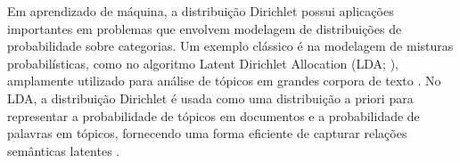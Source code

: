 Em aprendizado de máquina, a distribuição Dirichlet possui aplicações importantes em problemas que envolvem modelagem de distribuições de probabilidade sobre categorias. Um exemplo clássico é na modelagem de misturas probabilísticas, como no algoritmo Latent Dirichlet Allocation (LDA; \citealp{lda}), amplamente utilizado para análise de tópicos em grandes corpora de texto \cite{jelodar2019}. No LDA, a distribuição Dirichlet é usada como uma distribuição a priori para representar a probabilidade de tópicos em documentos e a probabilidade de palavras em tópicos, fornecendo uma forma eficiente de capturar relações semânticas latentes \cite{canini2009}.









